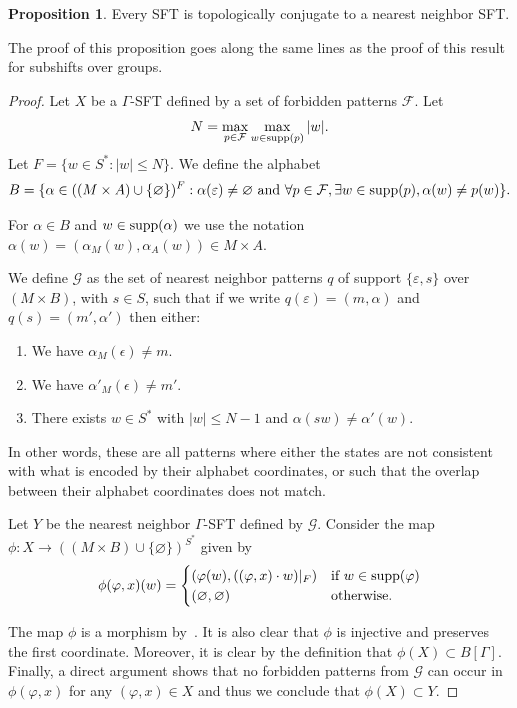 \documentclass{article}
\theoremstyle{definition}
\newtheorem{prop}[theorem]{Proposition}
\theoremstyle{definition}
\newcommand{\Fo}{\mathcal{F}}
\newcommand{\supp}{\textnormal{supp}}
\begin{document}
\begin{prop}
    Every SFT is topologically conjugate to a nearest neighbor SFT.
\end{prop}

The proof of this proposition goes along the same lines as the proof of this result for subshifts over groups.

\begin{proof}
Let $X$ be a $\Gamma$-SFT defined by a set of forbidden patterns $\Fo$. Let \[N=\max_{p\in\Fo}\max_{w\in\supp(p)}|w|.\] Let $F = \{w \in S^* : |w|\leq N\}$. We define the alphabet $$B = \{\alpha\in ((M\times A)\cup \{\varnothing\})^{F} : \alpha(\varepsilon)\neq \varnothing \mbox{ and } \forall p\in\Fo, \exists w \in \supp(p), \alpha(w) \neq p(w)\}.$$

For $\alpha \in B$ and $w \in \supp(\alpha)$ we use the notation $\alpha(w) = (\alpha_M(w),\alpha_A(w))\in M \times A$.

We define $\mathcal{G}$ as the set of nearest neighbor patterns $q$ of support $\{\varepsilon,s\}$ over $(M\times B)$, with $s\in S$, such that if we write $q(\varepsilon) = (m,\alpha)$ and $q(s)=(m',\alpha')$ then either:
\begin{enumerate}
    \item We have $\alpha_M(\epsilon)\neq m$.
    \item We have $\alpha'_M(\epsilon) \neq m'$.
    \item There exists $w\in S^*$ with $|w|\leq N-1$ and $\alpha(sw)\neq \alpha'(w)$.
\end{enumerate}

In other words, these are all patterns where either the states are not consistent with what is encoded by their alphabet coordinates, or such that the overlap between their alphabet coordinates does not match.

 Let $Y$ be the nearest neighbor $\Gamma$-SFT defined by $\mathcal{G}$. Consider the map $\phi \colon X \to ((M\times B)\cup\{\varnothing\})^{S^*}$ given by \[  \phi(\varphi,x)(w) = \begin{cases} (\varphi(w), ((\varphi,x)\cdot w)|_{F}) & \mbox{if } w \in \supp(\varphi)\\
 (\varnothing,\varnothing) & \mbox{otherwise}.
 \end{cases}\]
 
 The map $\phi$ is a morphism by~. It is also clear that $\phi$ is injective and preserves the first coordinate. Moreover, it is clear by the definition that $\phi(X) \subset B[\Gamma]$. Finally, a direct argument shows that no forbidden patterns from $\mathcal{G}$ can occur in $\phi(\varphi,x)$ for any $(\varphi,x) \in X$ and thus we conclude that $\phi(X)\subset Y$.


\end{proof}
\end{document}
